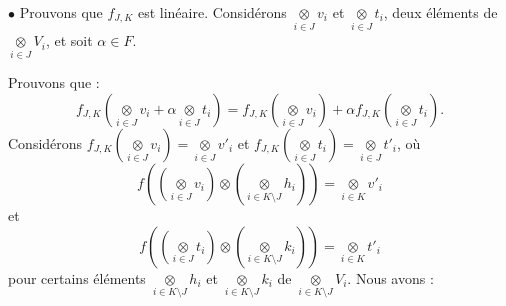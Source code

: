 \documentclass[a4paper, 14pt]{report}
\begin{document}
\begin{onehalfspace}
{\begin{enumerate}
				$\bullet$
				Prouvons que $f_{J,K}$ est linéaire. Considérons $\underset{i\in J}\otimes v_i$ et $\underset{i\in J}\otimes t_i$, deux éléments de $\underset{i\in J}\otimes V_i$, et soit $\alpha\in F$.
				
				Prouvons que :
				\[
				f_{J,K}(\underset{i\in J}\otimes v_i+ \alpha \underset{i\in J}\otimes t_i)= f_{J,K}(\underset{i\in J}\otimes v_i)+ \alpha f_{J,K}(\underset{i\in J}\otimes t_i).
				\]
				Considérons $f_{J,K}(\underset{i\in J}\otimes v_i)= \underset{i\in J}\otimes v'_i$ et $f_{J,K}(\underset{i\in J}\otimes t_i)= \underset{i\in J}\otimes t'_i$, où  
				\[
				f((\underset{i\in J}\otimes v_i)\otimes (\underset{i\in K\setminus J}\otimes h_i))= \underset{i\in K}\otimes v'_i
				\]
				et  
				\[
				f((\underset{i\in J}\otimes t_i)\otimes (\underset{i\in K\setminus J}\otimes k_i))= \underset{i\in K}\otimes t'_i
				\]
				pour certains éléments $\underset{i\in K\setminus J}\otimes h_i$ et $\underset{i\in K\setminus J}\otimes k_i$ de $\underset{i\in K\setminus J}\otimes V_i$. Nous avons :
				

\end{enumerate}}
\end{onehalfspace}
\end{document}
